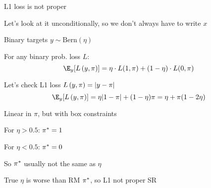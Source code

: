 \documentclass[11pt,compress,t,notes=noshow, xcolor=table]{beamer}
\begin{document}
\begin{framei}[sep=M]{L1 loss is not proper}


\item Let's look at it unconditionally, so we don't always have to write $x$
    
\item Binary targets $y \sim \text{Bern}(\eta)$ %


\item For any binary prob. loss $L$:
$$\E_{y}[\Lpiy]=\eta \cdot L(1, \pi) + (1-\eta) \cdot L(0, \pi)$$

\item Let's check L1 loss $L\left(y, \pi\right)=|y-\pi|$
$$\E_y[\Lpiy]=\eta |1-\pi| + (1-\eta) \pi = \eta+\pi(1-2\eta)$$

\item Linear in $\pi$, but with box constraints


\item For $\eta > 0.5$: $\pi^{\ast} =1$ 

\item For $\eta < 0.5$: $\pi^{\ast} = 0$

\item So $\pi^{\ast}$ usually not the same as $\eta$

\item True $\eta$ is worse than RM $\pi^{\ast}$, so L1 not proper SR


\end{framei}
\end{document}
